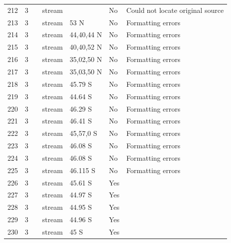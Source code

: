 \documentclass[12pt]{article}
\begin{document}
\begin{landscape}
\begin{table}[h!]
{\begin{tabular}{p{2.8cm}p{1.3cm}p{3cm}p{2.2cm}p{2.5cm}lp{8.2cm}}
        212   & 3 & \cite{Ricker1935}  & stream &       & No    & Could not locate original source \\
        213   & 3 & \cite{Badcock1949}     & stream & 53 N  & No  &  Formatting errors     \\
        214   & 3 & \cite{Thompson2003}    & stream & 44,40,44 N & No  &  Formatting errors     \\
        215   & 3 & \cite{Thompson2003}    & stream & 40,40,52 N & No  &  Formatting errors     \\
        216   & 3 & \cite{Thompson2003}    & stream & 35,02,50 N & No  &  Formatting errors     \\
        217   & 3 & \cite{Thompson2003}    & stream & 35,03,50 N & No  &  Formatting errors     \\
        218   & 3 & \cite{Thompson2004c}  & stream & 45.79 S & No  &  Formatting errors     \\
        219   & 3 & \cite{Thompson2004c}  & stream & 44.64 S & No  &  Formatting errors     \\
        220   & 3 & \cite{Thompson2004c}  & stream & 46.29 S & No  &  Formatting errors     \\
        221   & 3 & \cite{Thompson2004c}  & stream & 46.41 S & No  &  Formatting errors     \\
        222   & 3 & \cite{Thompson2004c}  & stream & 45,57,0 S & No  &  Formatting errors     \\
        223   & 3 & \cite{Thompson2004c}  & stream & 46.08 S & No  &  Formatting errors     \\
        224   & 3 & \cite{Thompson2004c}  & stream & 46.08 S & No  &  Formatting errors     \\
        225   & 3 & \cite{Thompson2004c}  & stream & 46.115 S & No  &  Formatting errors     \\
        226   & 3 & \cite{Thompson2004c}  & stream & 45.61 S & Yes   &       \\
        227   & 3 & \cite{Thompson2004c}  & stream & 44.97 S & Yes   &       \\
        228   & 3 & \cite{Thompson2004c}  & stream & 44.95 S & Yes   &       \\
        229   & 3 & \cite{Thompson2004c}  & stream & 44.96 S & Yes   &       \\
        230   & 3 & \cite{Thompson2004c}  & stream & 45 S  & Yes   &       \\
        \hline
      \end{tabular}}%
      \end{table}


\end{landscape}
\end{document}
